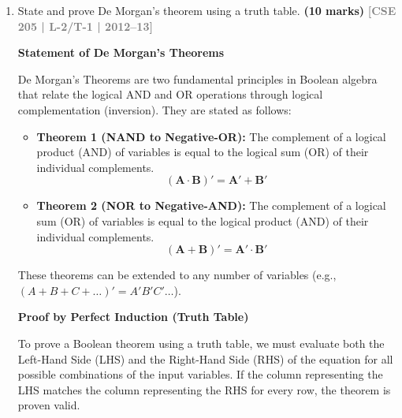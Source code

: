 \documentclass[12pt,a3paper]{article}
\newcommand{\yr}[1]{\hfill\textcolor{gray}{\small\textbf{[#1]}}}
\newcommand{\mk}[1]{\textcolor{orange!70!black}{\small\textbf{(#1 marks)}}}
\begin{document}
\begin{enumerate}
\begin{tcolorbox}[enhanced,breakable,ansbox,colback=cA!4,colframe=cA,boxrule=0.8pt,arc=5pt,title={\textbf{Answer}},fonttitle=\bfseries\color{white},colbacktitle=cA]
\begin{align*}
(ABC)' &= ((AB)C)' & \text{(Associative Law)} \\
&= (AB)' + C' & \text{(Two-variable De Morgan's on } (AB) \text{ and } C \text{)} \\
&= (A' + B') + C' & \text{(Two-variable De Morgan's on } AB \text{)} \\
&= A' + B' + C' & \text{(Associative Law)}
\end{align*}

Both forms rely purely on the principle of extending a two-variable theorem to $n$-variables through strategic substitution.

\end{tcolorbox}

\item State and prove De Morgan's theorem using a truth table.
\mk{10} \yr{CSE 205 | L-2/T-1 | 2012--13}

\begin{tcolorbox}[enhanced,breakable,ansbox,colback=cA!4,colframe=cA,boxrule=0.8pt,arc=5pt,title={\textbf{Answer}},fonttitle=\bfseries\color{white},colbacktitle=cA]

\textbf{Statement of De Morgan's Theorems}

De Morgan's Theorems are two fundamental principles in Boolean algebra that relate the logical AND and OR operations through logical complementation (inversion). They are stated as follows:

\begin{itemize}
    \item \textbf{Theorem 1 (NAND to Negative-OR):} The complement of a logical product (AND) of variables is equal to the logical sum (OR) of their individual complements.
    \[ \mathbf{(A \cdot B)' = A' + B'} \]
    \item \textbf{Theorem 2 (NOR to Negative-AND):} The complement of a logical sum (OR) of variables is equal to the logical product (AND) of their individual complements.
    \[ \mathbf{(A + B)' = A' \cdot B'} \]
\end{itemize}

These theorems can be extended to any number of variables (e.g., $(A+B+C+\dots)' = A'B'C'\dots$).

\vspace{0.4cm}
\textbf{Proof by Perfect Induction (Truth Table)}

To prove a Boolean theorem using a truth table, we must evaluate both the Left-Hand Side (LHS) and the Right-Hand Side (RHS) of the equation for all possible combinations of the input variables. If the column representing the LHS matches the column representing the RHS for every row, the theorem is proven valid.


\end{tcolorbox}
\end{enumerate}
\end{document}
